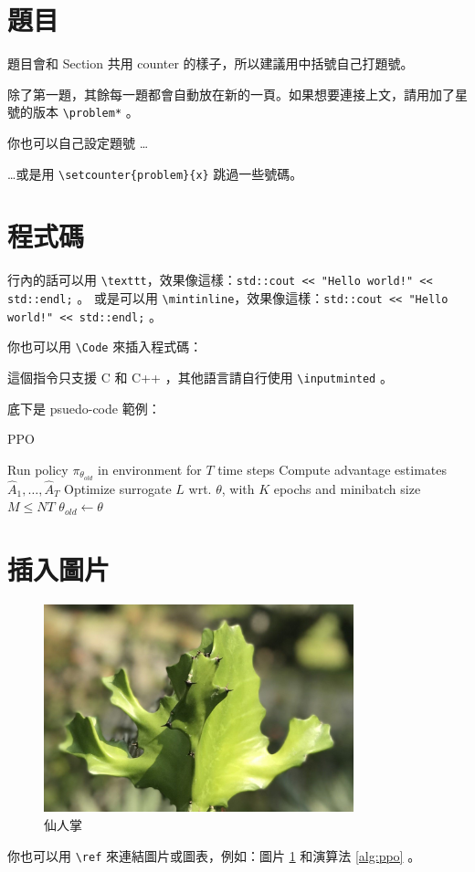 \documentclass{homework}
\begin{document}
\section{題目}

題目會和 Section 共用 counter 的樣子，所以建議用中括號自己打題號。

\problem*
除了第一題，其餘每一題都會自動放在新的一頁。如果想要連接上文，請用加了星號的版本 \verb|\problem*| 。

\problem*[Rec--2.1]
你也可以自己設定題號 \dots

\setcounter{problem}{7}
\problem*
\dots 或是用 \verb|\setcounter{problem}{x}| 跳過一些號碼。

\setcounter{section}{3}

\section{程式碼}

行內的話可以用 \verb|\texttt|，效果像這樣：\texttt{std::cout << "Hello world!" << std::endl;} 。
或是可以用 \verb|\mintinline|，效果像這樣：\texttt{std::cout << "Hello world!" << std::endl;} 。

你也可以用 \verb|\Code| 來插入程式碼：


這個指令只支援 C 和 C++ ，其他語言請自行使用 \verb|\inputminted| 。

底下是 psuedo-code 範例：

\begin{algorithm}[H]
	\caption{PPO}
	\label{alg:ppo}
	\begin{algorithmic}[1]
		\State Run policy $\pi_{\theta_{old}}$ in environment for $T$ time steps
		\State Compute advantage estimates $\hat{A}_{1},\ldots,\hat{A}_{T}$
		\EndFor
		\State Optimize surrogate $L$ wrt. $\theta$, with $K$ epochs and minibatch size $M\leq NT$
		\State $\theta_{old}\leftarrow\theta$
		\EndFor
	\end{algorithmic}
\end{algorithm}

\section{插入圖片}

\begin{figure}[htpb]
	\centering
	\includegraphics[width=0.8\textwidth]{files/cactus.jpeg}
	\caption{仙人掌}
	\label{fig:cactus}
\end{figure}

你也可以用 \verb|\ref| 來連結圖片或圖表，例如：圖片 \ref{fig:cactus} 和演算法 \ref{alg:ppo} 。
\end{document}
